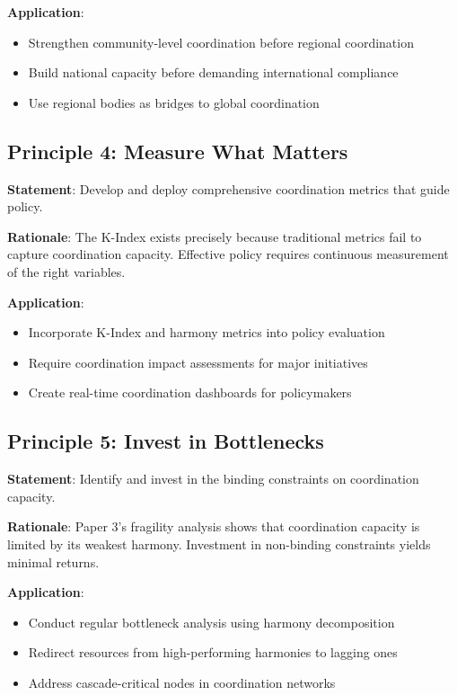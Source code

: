 \documentclass[12pt,letterpaper]{article}
\begin{document}
\textbf{Application}:
\begin{itemize}
    \item Strengthen community-level coordination before regional coordination
    \item Build national capacity before demanding international compliance
    \item Use regional bodies as bridges to global coordination
\end{itemize}

\subsection{Principle 4: Measure What Matters}

\textbf{Statement}: Develop and deploy comprehensive coordination metrics that guide policy.

\textbf{Rationale}: The K-Index exists precisely because traditional metrics fail to capture coordination capacity. Effective policy requires continuous measurement of the right variables.

\textbf{Application}:
\begin{itemize}
    \item Incorporate K-Index and harmony metrics into policy evaluation
    \item Require coordination impact assessments for major initiatives
    \item Create real-time coordination dashboards for policymakers
\end{itemize}

\subsection{Principle 5: Invest in Bottlenecks}

\textbf{Statement}: Identify and invest in the binding constraints on coordination capacity.

\textbf{Rationale}: Paper 3's fragility analysis shows that coordination capacity is limited by its weakest harmony. Investment in non-binding constraints yields minimal returns.

\textbf{Application}:
\begin{itemize}
    \item Conduct regular bottleneck analysis using harmony decomposition
    \item Redirect resources from high-performing harmonies to lagging ones
    \item Address cascade-critical nodes in coordination networks
\end{itemize}
\end{document}
